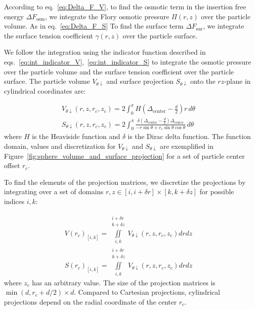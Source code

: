 \documentclass[10pt, a4paper]{article}
\begin{document}
\begin{multicols}{2}
According to eq.~\ref{eq:Delta_F_V}, to find the osmotic term in the insertion free energy $\Delta F_{\text{osm}}$, we integrate the Flory osmotic pressure $\Pi(r, z)$ over the particle volume.
As in eq.~\ref{eq:Delta_F_S} To find the surface term $\Delta F_{\text{sur}}$, we integrate the surface tension coefficient $\gamma(r, z)$ over the particle surface.

We follow the integration using the indicator function described in eqs.~\ref{eq:int_indicator_V},~\ref{eq:int_indicator_S} to integrate the osmotic pressure over the particle volume and the surface tension coefficient over the particle surface.
The particle volume $V_{\theta \downarrow}$ and surface projection $S_{\theta \downarrow}$ onto the $rz$-plane in cylindrical coordinates are:

\begin{gather}
    V_{\theta \downarrow}(r, z, r_c, z_c) = 2\int_{0}^{\pi} H\left( \Delta_{\text{center}} - \frac{d}{2} \right) r \, d\theta
    \\
    S_{\theta \downarrow}(r, z, r_c, z_c) = 2\int_{0}^{\pi} \frac{\delta \left( \Delta_{\text{center}} - \frac{d}{2} \right) \Delta_{\text{center}}}{-r \sin \theta + r_c \sin \theta \cos \theta} \, d\theta
\end{gather}
where $H$ is the Heaviside function and $\delta$ is the Dirac delta function.
The function domain, values and discretization for $V_{\theta \downarrow}$ and $S_{\theta \downarrow}$ are exemplified in Figure~\ref{fig:sphere_volume_and_surface_projection} for a set of particle center offset $r_c$.

To find the elements of the projection matrices, we discretize the projections by integrating over a set of domains $r, z \in [i, i + \delta r] \times [k, k + \delta z]$ for possible indices $i, k$:

\begin{eqnarray}
    V(r_c)_{[i, k]} = \iint \limits_{i, k}^{\substack{i+\delta r\\ k+\delta z}} V_{\theta \downarrow} (r, z, r_c, z_c) dr dz
    \\
    S(r_c)_{[i, k]} = \iint \limits_{i, k}^{\substack{i+\delta r\\ k+\delta z}} V_{\theta \downarrow} (r, z, r_c, z_c) dr dz
\end{eqnarray}
where $z_c$ has an arbitrary value.
The size of the projection matrices is $\min(d, r_c + d/2) \times d$.
Compared to Cartesian projections, cylindrical projections depend on the radial coordinate of the center $r_c$.


\end{multicols}
\end{document}
